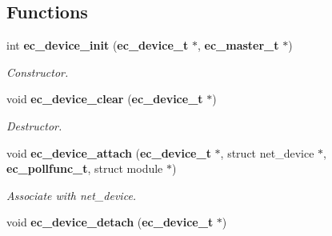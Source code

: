\subsection*{Functions}
\begin{DoxyCompactItemize}
\item 
int {\bf ec\-\_\-device\-\_\-init} ({\bf ec\-\_\-device\-\_\-t} $\ast$, {\bf ec\-\_\-master\-\_\-t} $\ast$)
\begin{DoxyCompactList}\small\item\em Constructor. \end{DoxyCompactList}\item 
void {\bf ec\-\_\-device\-\_\-clear} ({\bf ec\-\_\-device\-\_\-t} $\ast$)\label{device_8h_a3099aa0e5bfa03897b85f4b542108d87}

\begin{DoxyCompactList}\small\item\em Destructor. \end{DoxyCompactList}\item 
void {\bf ec\-\_\-device\-\_\-attach} ({\bf ec\-\_\-device\-\_\-t} $\ast$, struct net\-\_\-device $\ast$, {\bf ec\-\_\-pollfunc\-\_\-t}, struct module $\ast$)\label{device_8h_a7f14ad3873acec6c4aab27a403b86e2f}

\begin{DoxyCompactList}\small\item\em Associate with net\-\_\-device. \end{DoxyCompactList}\item 
void {\bf ec\-\_\-device\-\_\-detach} ({\bf ec\-\_\-device\-\_\-t} $\ast$)\label{device_8h_a6aa86617de7ed991048e151847683a01}


\end{DoxyCompactItemize}

